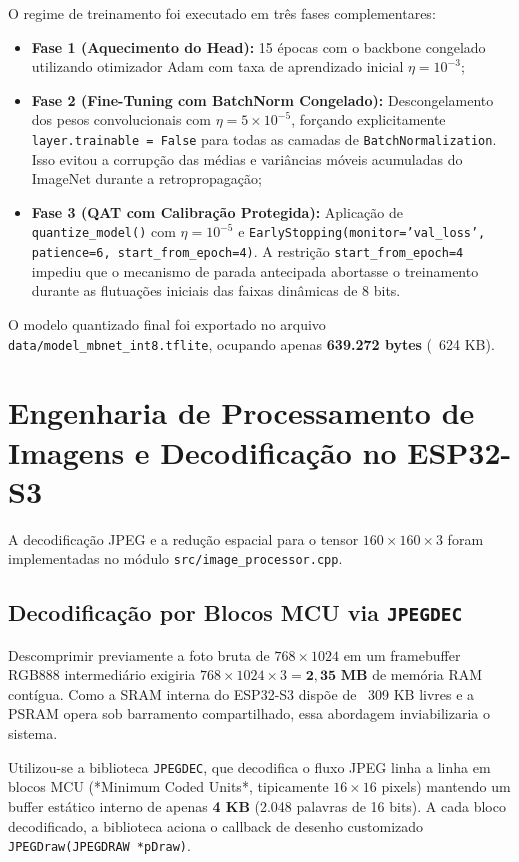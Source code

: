 O regime de treinamento foi executado em três fases complementares:
\begin{itemize}
    \item \textbf{Fase 1 (Aquecimento do Head):} 15 épocas com o backbone congelado utilizando otimizador Adam com taxa de aprendizado inicial $\eta = 10^{-3}$;
    \item \textbf{Fase 2 (Fine-Tuning com BatchNorm Congelado):} Descongelamento dos pesos convolucionais com $\eta = 5 \times 10^{-5}$, forçando explicitamente \texttt{layer.trainable = False} para todas as camadas de \texttt{BatchNormalization}. Isso evitou a corrupção das médias e variâncias móveis acumuladas do ImageNet durante a retropropagação;
    \item \textbf{Fase 3 (QAT com Calibração Protegida):} Aplicação de \texttt{quantize\_model()} com $\eta = 10^{-5}$ e \texttt{EarlyStopping(monitor='val\_loss', patience=6, start\_from\_epoch=4)}. A restrição \texttt{start\_from\_epoch=4} impediu que o mecanismo de parada antecipada abortasse o treinamento durante as flutuações iniciais das faixas dinâmicas de 8 bits.
\end{itemize}

O modelo quantizado final foi exportado no arquivo \texttt{data/model\_mbnet\_int8.tflite}, ocupando apenas \textbf{639.272 bytes} (~624 KB).

\section{Engenharia de Processamento de Imagens e Decodificação no ESP32-S3}
\label{sec:processamento_imagens}

A decodificação JPEG e a redução espacial para o tensor $160 \times 160 \times 3$ foram implementadas no módulo \texttt{src/image\_processor.cpp}. 

\subsection{Decodificação por Blocos MCU via \texttt{JPEGDEC}}

Descomprimir previamente a foto bruta de $768 \times 1024$ em um framebuffer RGB888 intermediário exigiria $768 \times 1024 \times 3 = \mathbf{2,35\text{ MB}}$ de memória RAM contígua. Como a SRAM interna do ESP32-S3 dispõe de ~309 KB livres e a PSRAM opera sob barramento compartilhado, essa abordagem inviabilizaria o sistema.

Utilizou-se a biblioteca \texttt{JPEGDEC}, que decodifica o fluxo JPEG linha a linha em blocos MCU (*Minimum Coded Units*, tipicamente $16 \times 16$ pixels) mantendo um buffer estático interno de apenas \textbf{4 KB} (2.048 palavras de 16 bits). A cada bloco decodificado, a biblioteca aciona o callback de desenho customizado \texttt{JPEGDraw(JPEGDRAW *pDraw)}.

